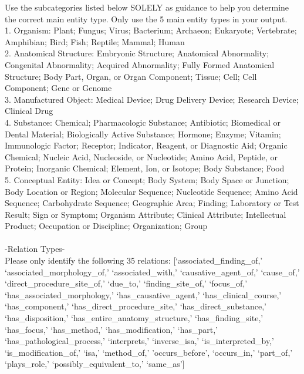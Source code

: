 \documentclass[10pt]{article}
\begin{document}
\begin{appendices}
\begin{tcolorbox}
Use the subcategories listed below SOLELY as guidance to help you determine the correct main entity type. Only use the 5 main entity types in your output.\\

1. Organism: Plant; Fungus; Virus; Bacterium; Archaeon; Eukaryote; Vertebrate; Amphibian; Bird; Fish; Reptile; Mammal; Human\\
2. Anatomical Structure: Embryonic Structure; Anatomical Abnormality; Congenital Abnormality; Acquired Abnormality; Fully Formed Anatomical Structure; Body Part, Organ, or Organ Component; Tissue; Cell; Cell Component; Gene or Genome\\
3. Manufactured Object: Medical Device; Drug Delivery Device; Research Device; Clinical Drug\\
4. Substance: Chemical; Pharmacologic Substance; Antibiotic; Biomedical or Dental Material; Biologically Active Substance; Hormone; Enzyme; Vitamin; Immunologic Factor; Receptor; Indicator, Reagent, or Diagnostic Aid; Organic Chemical; Nucleic Acid, Nucleoside, or Nucleotide; Amino Acid, Peptide, or Protein; Inorganic Chemical; Element, Ion, or Isotope; Body Substance; Food\\
5. Conceptual Entity: Idea or Concept; Body System; Body Space or Junction; Body Location or Region; Molecular Sequence; Nucleotide Sequence; Amino Acid Sequence; Carbohydrate Sequence; Geographic Area; Finding; Laboratory or Test Result; Sign or Symptom; Organism Attribute; Clinical Attribute; Intellectual Product; Occupation or Discipline; Organization; Group\\
\\
-Relation Types-\\
Please only identify the following 35 relations: [`associated\_finding\_of,' `associated\_morphology\_of,' `associated\_with,' `causative\_agent\_of,' `cause\_of,' `direct\_procedure\_site\_of,' `due\_to,' `finding\_site\_of,' `focus\_of,' `has\_associated\_morphology,' `has\_causative\_agent,' `has\_clinical\_course,' `has\_component,' `has\_direct\_procedure\_site,' `has\_direct\_substance,' `has\_disposition,' `has\_entire\_anatomy\_structure,' `has\_finding\_site,' `has\_focus,' `has\_method,' `has\_modification,' `has\_part,' `has\_pathological\_process,' `interprets,' `inverse\_isa,' `is\_interpreted\_by,' `is\_modification\_of,' `isa,' `method\_of,' 'occurs\_before', `occurs\_in,' `part\_of,' `plays\_role,' `possibly\_equivalent\_to,' `same\_as']\\


\end{tcolorbox}
\end{appendices}
\end{document}
